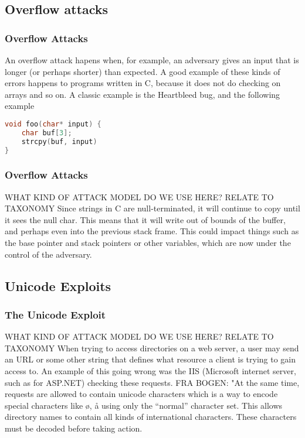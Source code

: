 \subsection{Overflow attacks}
\begin{frame}[fragile]
    \frametitle{Overflow Attacks}
        An overflow attack hapens when, for example, an adversary gives an input that is longer (or perhaps shorter) than expected. A good example of these kinds of errors happens to programs written in C, because it does not do checking on arrays and so on. A classic example is the Heartbleed bug, and the following example
        \begin{lstlisting}[language=C, frame=single]
void foo(char* input) {
    char buf[3];
    strcpy(buf, input)
}
        \end{lstlisting}

\end{frame}
    \begin{frame}
        \frametitle{Overflow Attacks}
                WHAT KIND OF ATTACK MODEL DO WE USE HERE? RELATE TO TAXONOMY
            Since strings in C are null-terminated, it will continue to copy until it sees the null char. This means that it will write out of bounds of the buffer, and perhaps even into the previous stack frame. This could impact things such as the base pointer and stack pointers or other variables, which are now under the control of the adversary.
    \end{frame}

    \subsection{Unicode Exploits}
        \begin{frame}
            \frametitle{The Unicode Exploit}
                WHAT KIND OF ATTACK MODEL DO WE USE HERE? RELATE TO TAXONOMY
                When trying to access directories on a web server, a user may send an URL or some other string that defines what resource a client is trying to gain access to. An example of this going wrong was the IIS (Microsoft internet server, such as for ASP.NET) checking these requests. 
                FRA BOGEN:
                "At the same time, requests are allowed to contain unicode characters which is a way to encode special characters like ø, å using only the “normal” character set. This allows directory names to contain all kinds of international characters. These characters must be decoded before taking action.
        \end{frame}

